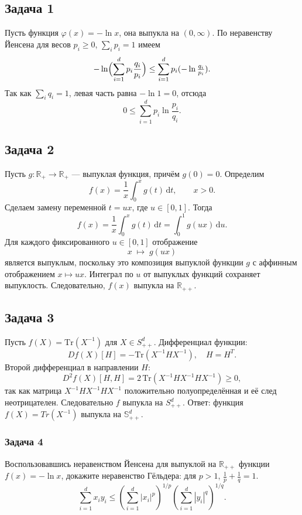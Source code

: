 \documentclass[a4paper,12pt]{article}
\begin{document}
\subsection*{Задача 1}
Пусть функция $\varphi(x) = -\ln x$, она выпукла на $(0,\infty)$. По неравенству Йенсена для весов $p_i\ge0$, $\sum_i p_i=1$ имеем
\[
-\ln\Bigl(\sum_{i=1}^d p_i\frac{q_i}{p_i}\Bigr)\le\sum_{i=1}^d p_i(-\ln\tfrac{q_i}{p_i}).
\]
Так как $\sum_i q_i=1$, левая часть равна $-\ln1=0$, отсюда
\[
0\le\sum_{i=1}^d p_i\ln\frac{p_i}{q_i}.
\]

\subsection*{Задача 2}
Пусть \(g\colon\mathbb R_{+}\to\mathbb R_{+}\) — выпуклая функция, причём \(g(0)=0\). Определим
\[
f(x)=\frac1x\int_0^x g(t)\,\mathrm{d}t,\qquad x>0.
\]
Сделаем замену переменной \(t=ux\), где \(u\in[0,1]\). Тогда
\[
f(x)
=\frac1x\int_0^x g(t)\,\mathrm{d}t
=\int_0^1 g(ux)\,\mathrm{d}u.
\]
Для каждого фиксированного \(u\in[0,1]\) отображение 
\[
x\;\longmapsto\;g(ux)
\]
является выпуклым, поскольку это композиция выпуклой функции \(g\) с аффинным отображением \(x\mapsto ux\). Интеграл по \(u\) от выпуклых функций сохраняет выпуклость. Следовательно, \(f(x)\) выпукла на \(\mathbb R_{++}\).

\subsection*{Задача 3}
Пусть $f(X)=\mathrm{Tr}(X^{-1})$ для $X\in S_{++}^d$. Дифференциал функции:
\[Df(X)[H]=-\mathrm{Tr}(X^{-1}HX^{-1}),\quad H=H^T.\]
Второй дифференциал в направлении $H$:
\[D^2f(X)[H,H]=2\,\mathrm{Tr}(X^{-1}HX^{-1}HX^{-1})\ge0,\]
так как матрица $X^{-1}HX^{-1}HX^{-1}$ положительно полуопределённая и её след неотрицателен. Следовательно $f$ выпукла на $S_{++}^d$.
	Ответ: функция $f(X) = Tr(X^{-1})$ выпукла на $\mathbb{S}_{++}^{d}$.
	
	\subsubsection*{Задача 4}
	
	Воспользовавшись неравенством Йенсена для выпуклой на $\mathbb{R}_{++}$ функции $f(x) = -\ln x$, докажите неравенство Гёльдера:
	для $p > 1$, $\frac{1}{p} + \frac{1}{q} = 1$.
	$$
	\sum_{i=1}^{d} x_i y_i \le \left(\sum_{i=1}^{d} |x_i|^p\right)^{1/p} \left(\sum_{i=1}^{d} |y_i|^q\right)^{1/q}.
	$$
	
\end{document}
